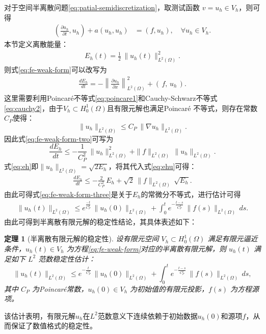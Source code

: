 \documentclass{GZUbachelorthesis}
\theoremstyle{chineseplain}
\newtheorem{theorem}{定理}[section]
\begin{document}
对于空间半离散问题\eqref{eq:patial-semidiscretization}，取测试函数 $v = u_h \in V_h$，则可得
\begin{align}
	\left( \frac{\partial u_h}{\partial t}, u_h \right) + a(u_h, u_h) &= (f, u_h),\quad \forall u_h \in V_h.
	\label{eq:fe-weak-form} 
\end{align}
本节定义离散能量：
\begin{align}
	E_h(t) = \frac{1}{2} \, \| u_h(t) \|_{L^2(\Omega)}^2.
	\label{eq:eh}
\end{align}
则式\eqref{eq:fe-weak-form}可以改写为
\begin{align}
\frac{d E_h}{d t} = - \left\| \frac{\partial u_h}{\partial x} \right\|_{L^2(\Omega)}^2 + (\, f, \, u_h \,).
\label{eq:fe-weak-form-two}
\end{align}
这里需要利用Poincar\'{e}不等式\eqref{eq:poincare1}和Cauchy-Schwarz不等式\eqref{eq:cauchy2}，由于$V_h\subset H^1_0(\Omega) $且有限元解也满足Poincar\'{e} 不等式，则存在常数$C_{P}$使得：
\[
\| u_h \|_{L^2(\Omega)} \leq C_{P} \, \| \nabla u_h \|_{L^2(\Omega)}.
\]
因此式\eqref{eq:fe-weak-form-two}可写为
\begin{equation}\label{eq:ehu}
\frac{dE_h}{dt} \leq -\frac{1}{C_{P}^2} \, \| u_h \|_{L^2(\Omega)}^2 + \| f \|_{L^2(\Omega)} \, \| u_h \|_{L^2(\Omega)}.
\end{equation}
式\eqref{eq:eh}即$ \| u_h \|_{L^2(\Omega)}=\sqrt{2E_h}$，将其代入式\eqref{eq:ehu}可得：
\begin{align}
\frac{dE_h}{dt} \leq -\frac{2}{C_{P}^2} \, E_h + \sqrt{2} \, \| f \|_{L^2(\Omega)} \, \sqrt{E_h}.
\label{eq:fe-weak-form-three}
\end{align}
由此可得式\eqref{eq:fe-weak-form-three}是关于$E_h$的常微分不等式，进行估计可得
\begin{align}
\| u_h(t) \|_{L^2(\Omega)} \leq e^{\frac{-t}{C_{P}^2}} \, \| u_h(0) \|_{L^2(\Omega)} + \int_0^t e^{-\frac{t-s}{C_{P}^2}}  \, \| f(s) \|_{L^2(\Omega)} \, ds.
\end{align}
由此可得到半离散有限元解的稳定性结论，其具体表述如下：
\begin{theorem}[半离散有限元解的稳定性]
	设有限元空间 $V_h \subset H_0^1(\Omega)$ 满足有限元逼近条件，$u_h(t) \in V_h$ 为方程\eqref{eq:fe-weak-form}对应的半离散有限元解，则 $u_h(t)$ 满足如下 $L^2$ 范数稳定性估计：
	\begin{equation}
		\label{eq:stability-estimate}
		\| u_h(t) \|_{L^2(\Omega)} \leq e^{-\frac{t}{C_{P}^2}} \, \| u_h(0) \|_{L^2(\Omega)} + \int_0^t e^{-\frac{t-s}{C_{P}^2}} \, \| f(s) \|_{L^2(\Omega)} \, ds,
	\end{equation}
	其中 $C_P$ 为Poincaré常数，$u_h(0) \in V_h$ 为初始值的有限元投影，$f(s)$ 为方程源项。
\end{theorem}
该估计表明，有限元解$u_h$在$L^2$范数意义下连续依赖于初始数据$u_h(0)$和源项$f$，从而保证了数值格式的稳定性。
\end{document}

